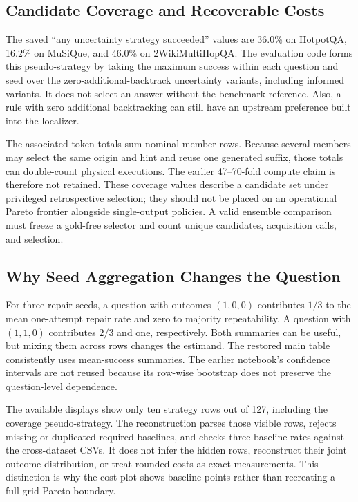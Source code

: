 \documentclass{article}
\begin{document}
\subsection{Candidate Coverage and Recoverable Costs}
The saved ``any uncertainty strategy succeeded'' values are 36.0\% on
HotpotQA, 16.2\% on MuSiQue, and 46.0\% on 2WikiMultiHopQA. The evaluation
code forms this pseudo-strategy by taking the maximum success within each
question and seed over the zero-additional-backtrack uncertainty variants,
including informed variants. It does not select an answer without the
benchmark reference. Also, a rule with zero additional backtracking can
still have an upstream preference built into the localizer.

The associated token totals sum nominal member rows. Because several
members may select the same origin and hint and reuse one generated
suffix, those totals can double-count physical executions. The earlier
47--70-fold compute claim is therefore not retained. These coverage
values describe a candidate set under privileged retrospective selection;
they should not be placed on an operational Pareto frontier alongside
single-output policies. A valid ensemble comparison must freeze a gold-free
selector and count unique candidates, acquisition calls, and selection.

\subsection{Why Seed Aggregation Changes the Question}
For three repair seeds, a question with outcomes $(1,0,0)$ contributes
$1/3$ to the mean one-attempt repair rate and zero to majority repeatability.
A question with $(1,1,0)$ contributes $2/3$ and one, respectively. Both
summaries can be useful, but mixing them across rows changes the estimand.
The restored main table consistently uses mean-success summaries. The
earlier notebook's confidence intervals are not reused because its
row-wise bootstrap does not preserve the question-level dependence.

The available displays show only ten strategy rows out of 127, including
the coverage pseudo-strategy. The reconstruction parses those visible
rows, rejects missing or duplicated required baselines, and checks three
baseline rates against the cross-dataset CSVs. It does not infer the
hidden rows, reconstruct their joint outcome distribution, or treat rounded
costs as exact measurements. This distinction is why the cost plot shows
baseline points rather than recreating a full-grid Pareto boundary.
\end{document}
